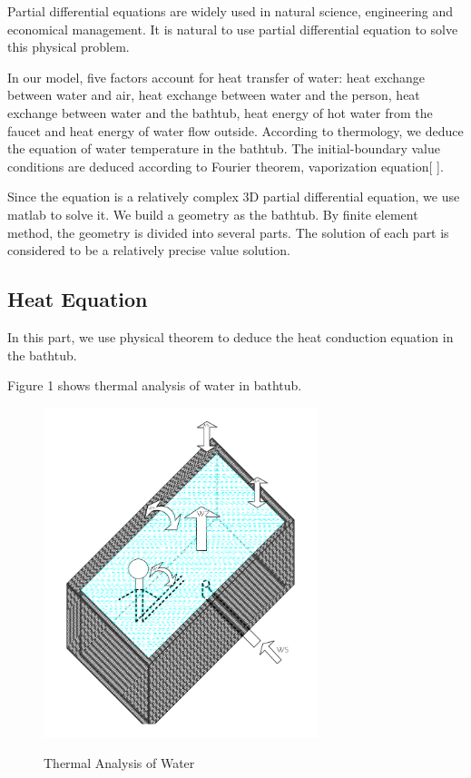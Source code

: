 \documentclass[12pt,a4paper,titlepage]{article}
\begin{document}
Partial differential equations are widely used in natural science, engineering and economical management.
It is natural to use partial differential equation to solve this physical problem.

In our model, five factors account for heat transfer of water: heat exchange between water and air, heat
exchange between water and the person, heat exchange between water and the bathtub, heat energy of hot water from the
faucet and heat energy of water flow outside. According to thermology, we deduce the equation
of water temperature in the bathtub. The initial-boundary value conditions are deduced according to
Fourier theorem, vaporization equation[ ].

Since the equation is a relatively complex 3D partial differential equation, we use matlab to solve it.
We build a geometry as the bathtub. By finite element method, the geometry is divided into several parts.
The solution of each part is considered to be a relatively precise value solution.



\subsection{Heat Equation}
\label{sec:heat equation}

In this part, we use physical theorem to deduce the heat conduction equation in the bathtub.

Figure 1 shows thermal analysis of water in bathtub.
\begin{figure}[htb]
  \centering
  \includegraphics[width=8cm]{2.pdf}\\
  \caption{Thermal Analysis of Water}\label{1_p}
\end{figure}
\end{document}
